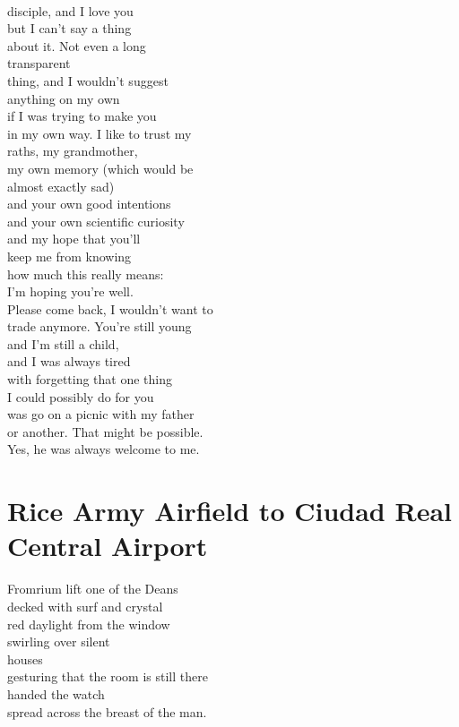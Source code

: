 \documentclass[smalldemyvopaper,11pt,twoside,onecolumn,openright,extrafontsizes]{memoir}
\begin{document}
\\disciple, and I love you
\\but I can't say a thing
\\about it. Not even a long
\\transparent
\\thing, and I wouldn't suggest
\\anything on my own
\\if I was trying to make you
\\in my own way. I like to trust my
\\raths, my grandmother,
\\my own memory (which would be
\\almost exactly sad)
\\and your own good intentions
\\and your own scientific curiosity
\\and my hope that you'll
\\keep me from knowing
\\how much this really means:
\\I'm hoping you're well.
\\Please come back, I wouldn't want to
\\trade anymore. You're still young
\\and I'm still a child,
\\and I was always tired
\\with forgetting that one thing
\\I could possibly do for you
\\was go on a picnic with my father
\\or another. That might be possible.
\\Yes, he was always welcome to me.



\chapter{Rice Army Airfield to Ciudad Real Central Airport}
Fromrium lift one of the Deans
\\decked with surf and crystal
\\red daylight from the window
\\swirling over silent
\\houses
\\gesturing that the room is still there
\\handed the watch
\\spread across the breast of the man.
\end{document}
